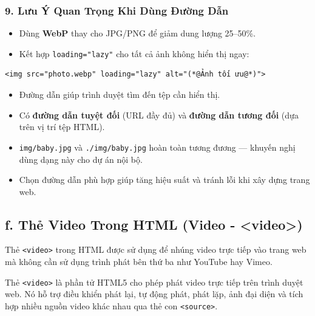 \documentclass[11pt,oneside]{book}
\newcommand{\codeinline}[1]{\textcolor{accentOrange}{\texttt{#1}}}
\begin{document}
\subsubsection{9. Lưu Ý Quan Trọng Khi Dùng Đường Dẫn}

\begin{tipBox}
\begin{itemize}[leftmargin=1.5em, itemsep=2pt, parsep=0pt]
    \item Dùng \textbf{WebP} thay cho JPG/PNG để giảm dung lượng 25--50\%.
    \item Kết hợp \codeinline{loading="lazy"} cho tất cả ảnh không hiển thị ngay:
\end{itemize}
\begin{codeWindow}
\begin{lstlisting}[language=HTML5]
<img src="photo.webp" loading="lazy" alt="(*@Ảnh tối ưu@*)">
\end{lstlisting}
\end{codeWindow}
\end{tipBox}

\begin{conceptBox}
\begin{itemize}[leftmargin=1.5em, itemsep=3pt, parsep=0pt]
    \item Đường dẫn giúp trình duyệt tìm đến tệp cần hiển thị.
    \item Có \textbf{đường dẫn tuyệt đối} (URL đầy đủ) và \textbf{đường dẫn tương đối} (dựa trên vị trí tệp HTML).
    \item \codeinline{img/baby.jpg} và \codeinline{./img/baby.jpg} hoàn toàn tương đương — khuyến nghị dùng dạng này cho dự án nội bộ.
    \item Chọn đường dẫn phù hợp giúp tăng hiệu suất và tránh lỗi khi xây dựng trang web.
\end{itemize}
\end{conceptBox}

\subsection{f. Thẻ Video Trong HTML (Video - <video>)}

Thẻ \codeinline{<video>} trong HTML được sử dụng để nhúng video trực tiếp vào trang web mà không cần sử dụng trình phát bên thứ ba như YouTube hay Vimeo.

\begin{conceptBox}
Thẻ \codeinline{<video>} là phần tử HTML5 cho phép phát video trực tiếp trên trình duyệt web. Nó hỗ trợ điều khiển phát lại, tự động phát, phát lặp, ảnh đại diện và tích hợp nhiều nguồn video khác nhau qua thẻ con \codeinline{<source>}.
\end{conceptBox}
\end{document}
